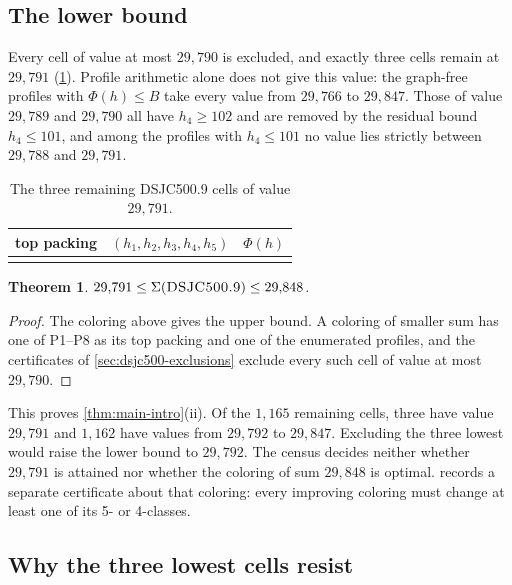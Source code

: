 \documentclass[11pt]{article}
\newtheorem{theorem}{Theorem}[section]
\theoremstyle{definition}
\newcommand{\DSJCFiveHundred}{\textnormal{\textsc{DSJC500.9}}}
\begin{document}
\subsection{The lower bound}

Every cell of value at most $29{,}790$ is excluded, and exactly three cells
remain at $29{,}791$ (\cref{tab:dsjc500-endpoints}). Profile arithmetic alone
does not give this value: the graph-free profiles with $\Phi(h)\le B$ take
every value from $29{,}766$ to $29{,}847$. Those of value $29{,}789$ and
$29{,}790$ all have $h_4\ge102$ and are removed by the residual bound
$h_4\le101$, and among the profiles with $h_4\le101$ no value lies strictly
between $29{,}788$ and $29{,}791$.

\begin{table}[t]
\centering
\caption{The three remaining \DSJCFiveHundred{} cells of value $29{,}791$.}
\label{tab:dsjc500-endpoints}
\begin{tabular}{@{}ccr@{}}
\toprule
top packing & $(h_1,h_2,h_3,h_4,h_5)$ & $\Phi(h)$\\
\midrule
\tabularnewline
\bottomrule
\end{tabular}
\end{table}

\begin{theorem}
\label{thm:dsjc500-interval}
$29{,}791\le\Sigma(\DSJCFiveHundred)\le29{,}848$.
\end{theorem}

\begin{proof}
The coloring above gives the upper bound. A coloring of smaller sum has one
of P1--P8 as its top packing and one of the enumerated profiles, and the
certificates of \cref{sec:dsjc500-exclusions} exclude every such cell of
value at most $29{,}790$.
\end{proof}

This proves \cref{thm:main-intro}(ii). Of the $1{,}165$ remaining cells,
three have value $29{,}791$ and $1{,}162$ have values from $29{,}792$ to
$29{,}847$. Excluding the three lowest would raise the lower bound to
$29{,}792$. The census decides neither whether $29{,}791$ is attained nor
whether the coloring of sum $29{,}848$ is optimal. 
records a separate certificate about that coloring: every improving coloring
must change at least one of its 5- or 4-classes.

\subsection{Why the three lowest cells resist}
\label{sec:dsjc500-limits}
\end{document}
